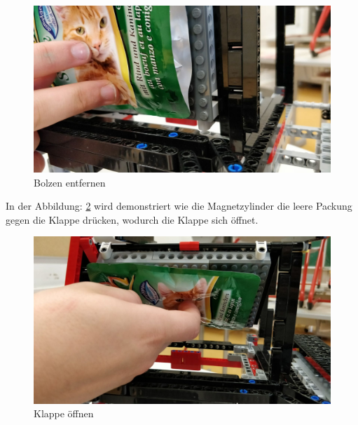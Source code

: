 \begin{figure}[H]
\begin{center}
\includegraphics[width=13cm]{Bilder/Ablauf_1_png/Auswurf_3}
\caption{Bolzen entfernen}
\label{Bolzen entfernen}
\end{center}
\end{figure}

In der Abbildung: \ref{Klappe öffnen} wird demonstriert wie die Magnetzylinder die leere Packung gegen die Klappe drücken, wodurch die Klappe sich öffnet.

\begin{figure}[H]
\begin{center}
\includegraphics[width=13cm]{Bilder/Ablauf_1_png/Auswurf_4}
\caption{Klappe öffnen}
\label{Klappe öffnen}
\end{center}
\end{figure}

